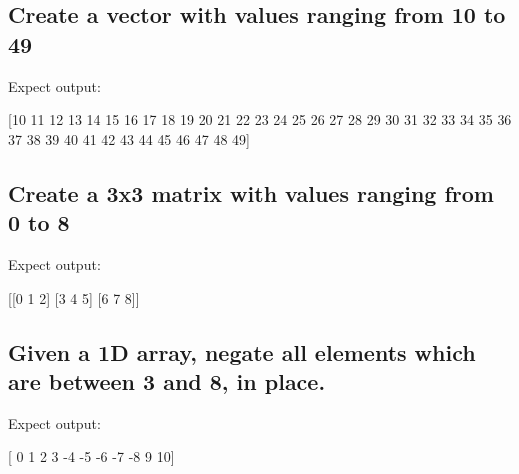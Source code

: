 \documentclass[11pt]{article}
\newenvironment{Shaded}{}{}
\newcommand{\DecValTok}[1]{\textcolor[rgb]{0.25,0.63,0.44}{{#1}}}
\newcommand{\NormalTok}[1]{{#1}}
\newcommand{\OperatorTok}[1]{\textcolor[rgb]{0.40,0.40,0.40}{{#1}}}
\begin{document}
    \subsection{Create a vector with values ranging from 10 to
49}\label{create-a-vector-with-values-ranging-from-10-to-49}

Expect output:

\begin{Shaded}
\begin{Highlighting}[]
\NormalTok{[}\DecValTok{10} \DecValTok{11} \DecValTok{12} \DecValTok{13} \DecValTok{14} \DecValTok{15} \DecValTok{16} \DecValTok{17} \DecValTok{18} \DecValTok{19} \DecValTok{20} \DecValTok{21} \DecValTok{22} \DecValTok{23} \DecValTok{24} \DecValTok{25} \DecValTok{26} \DecValTok{27} \DecValTok{28} \DecValTok{29} \DecValTok{30} \DecValTok{31} \DecValTok{32} \DecValTok{33} \DecValTok{34}
 \DecValTok{35} \DecValTok{36} \DecValTok{37} \DecValTok{38} \DecValTok{39} \DecValTok{40} \DecValTok{41} \DecValTok{42} \DecValTok{43} \DecValTok{44} \DecValTok{45} \DecValTok{46} \DecValTok{47} \DecValTok{48} \DecValTok{49}\NormalTok{]}
\end{Highlighting}
\end{Shaded}

    \subsection{Create a 3x3 matrix with values ranging from 0 to
8}\label{create-a-3x3-matrix-with-values-ranging-from-0-to-8}

Expect output:

\begin{Shaded}
\begin{Highlighting}[]
\NormalTok{[[}\DecValTok{0} \DecValTok{1} \DecValTok{2}\NormalTok{]}
\NormalTok{ [}\DecValTok{3} \DecValTok{4} \DecValTok{5}\NormalTok{]}
\NormalTok{ [}\DecValTok{6} \DecValTok{7} \DecValTok{8}\NormalTok{]]}
\end{Highlighting}
\end{Shaded}

    \subsection{Given a 1D array, negate all elements which are between 3
and 8, in
place.}\label{given-a-1d-array-negate-all-elements-which-are-between-3-and-8-in-place.}

Expect output:

\begin{Shaded}
\begin{Highlighting}[]
\NormalTok{[ }\DecValTok{0}  \DecValTok{1}  \DecValTok{2}  \DecValTok{3} \OperatorTok{-}\DecValTok{4} \OperatorTok{-}\DecValTok{5} \OperatorTok{-}\DecValTok{6} \OperatorTok{-}\DecValTok{7} \OperatorTok{-}\DecValTok{8}  \DecValTok{9} \DecValTok{10}\NormalTok{]}
\end{Highlighting}
\end{Shaded}
\end{document}

